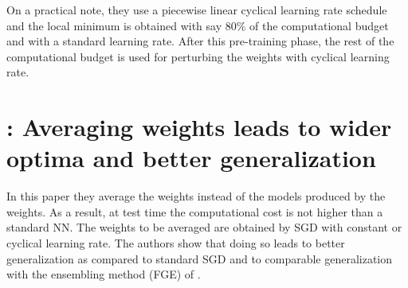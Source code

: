 On a practical note, they use a piecewise linear cyclical learning rate schedule and the local minimum is obtained with say $80\%$ of the computational budget and with a standard learning rate. 
After this pre-training phase, the rest of the computational budget is used for perturbing the weights with cyclical learning rate. 

\section{\textcite{izmailov2019averaging}: Averaging weights leads to wider optima and better generalization}
In this paper they average the weights instead of the models produced by the weights.
As a result, at test time the computational cost is not higher than a standard NN.
The weights to be averaged are obtained by SGD with constant or cyclical learning rate. 
The authors show that doing so leads to better generalization as compared to standard SGD and to comparable generalization with the ensembling method (FGE) of \textcite{garipov2018loss}.

